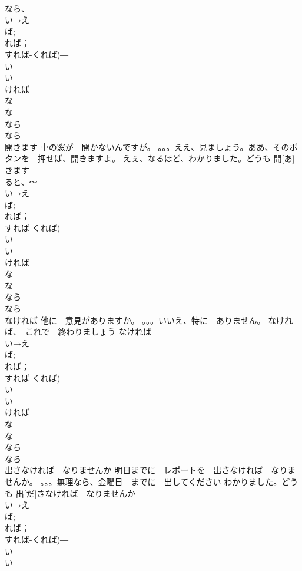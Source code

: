 \documentclass[8pt]{extreport}
\begin{document}
\begin{CJK}{UTF8}{min}
\\	なら、
\\	い→え
\\	ば;
\\	れば；
\\	すれば-くれば)―　
\\	い
\\	い　
\\	ければ　
\\	な 
\\	な
\\	なら　
\\	なら
\\	開きます	車の窓が　開かないんですが。 。。。ええ、見ましょう。ああ、そのボタンを　押せば、開きますよ。 えぇ、なるほど、わかりました。どうも	開[あ]きます			
\\	ると、～	
\\	い→え
\\	ば;
\\	れば；
\\	すれば-くれば)―　
\\	い
\\	い　
\\	ければ　
\\	な 
\\	な
\\	なら　
\\	なら
\\	なければ	他に　意見がありますか。 。。。いいえ、特に　ありません。 なければ、　これで　終わりましょう	なければ			
\\	い→え
\\	ば;
\\	れば；
\\	すれば-くれば)―　
\\	い
\\	い　
\\	ければ　
\\	な 
\\	な
\\	なら　
\\	なら
\\	出さなければ　なりませんか	明日までに　レポートを　出さなければ　なりませんか。 。。。無理なら、金曜日　までに　出してください わかりました。どうも	出[だ]さなければ　なりませんか			
\\	い→え
\\	ば;
\\	れば；
\\	すれば-くれば)―　
\\	い
\\	い　

\end{CJK}
\end{document}
